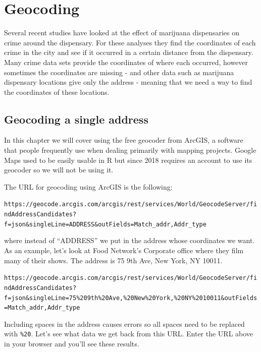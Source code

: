 \documentclass[
  12pt,
]{book}
\begin{document}
\hypertarget{geocoding}{%
\chapter{Geocoding}\label{geocoding}}

Several recent studies have looked at the effect of marijuana dispensaries on crime around the dispensary. For these analyses they find the coordinates of each crime in the city and see if it occurred in a certain distance from the dispensary. Many crime data sets provide the coordinates of where each occurred, however sometimes the coordinates are missing - and other data such as marijuana dispensary locations give only the address - meaning that we need a way to find the coordinates of these locations.

\hypertarget{geocoding-a-single-address}{%
\section{Geocoding a single address}\label{geocoding-a-single-address}}

In this chapter we will cover using the free geocoder from ArcGIS, a software that people frequently use when dealing primarily with mapping projects. Google Maps used to be easily usable in R but since 2018 requires an account to use its geocoder so we will not be using it.

The URL for geocoding using ArcGIS is the following:

\texttt{https://geocode.arcgis.com/arcgis/rest/services/World/GeocodeServer/findAddressCandidates?f=json\&singleLine=ADDRESS\&outFields=Match\_addr,Addr\_type}

where instead of ``ADDRESS'' we put in the address whose coordinates we want. As an example, let's look at Food Network's Corporate office where they film many of their shows. The address is 75 9th Ave, New York, NY 10011.

\texttt{https://geocode.arcgis.com/arcgis/rest/services/World/GeocodeServer/findAddressCandidates?f=json\&singleLine=75\%209th\%20Ave,\%20New\%20York,\%20NY\%2010011\&outFields=Match\_addr,Addr\_type}

Including spaces in the address causes errors so all spaces need to be replaced with \texttt{\%20}. Let's see what data we get back from this URL. Enter the URL above in your browser and you'll see these results.
\end{document}
